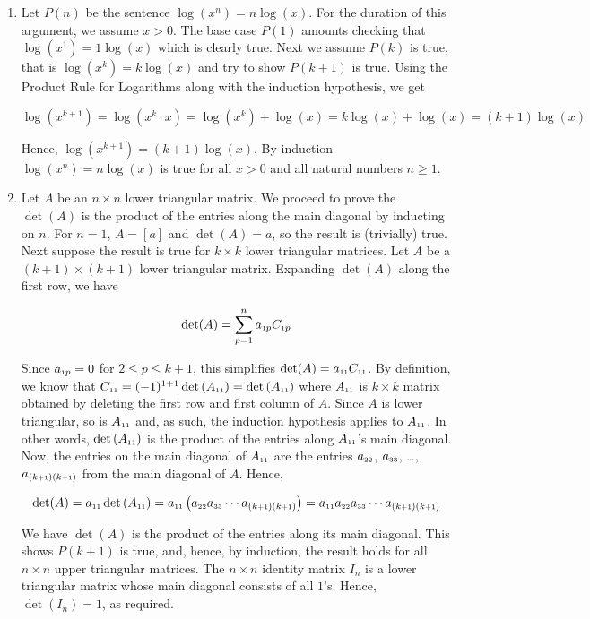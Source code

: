 \documentclass{ximera}
\begin{document}
\begin{enumerate}
\addtocounter{enumi}{1}

\item  Let $P(n)$ be the sentence $\log\left(x^n \right) = n \log(x)$.  For the duration of this argument, we assume $x > 0$. The base case $P(1)$ amounts checking that $\log\left(x^1\right) = 1 \log(x)$ which is clearly true.  Next we assume $P(k)$ is true, that is $\log\left(x^{k}\right) = k \log(x)$ and try to show $P(k+1)$ is true.  Using the Product Rule for Logarithms along with the induction hypothesis, we get

 \[\log\left(x^{k+1}\right) = \log\left(x^{k} \cdot x\right) = \log\left(x^{k}\right) + \log(x) = k \log(x) + \log(x) = (k+1) \log(x) \]
 
 Hence, $\log\left(x^{k+1}\right) = (k+1) \log(x)$.  By induction  $\log\left(x^n \right) = n \log(x)$ is true for all $x>0$ and all natural numbers $n \geq 1$.


\addtocounter{enumi}{2}

\item  Let $A$ be an $n \times n$ lower triangular matrix.  We proceed to prove the $\det(A)$ is the product of the entries along the main diagonal by inducting on $n$.  For $n=1$, $A = [a]$ and $\det(A) = a$, so the result is (trivially) true.  Next suppose the result is true for $k \times k$ lower triangular matrices.  Let $A$ be a $(k+1) \times (k+1)$ lower triangular matrix.  Expanding $\det(A)$ along the first row, we have

\[ \det(A)  = \displaystyle{\sum_{p=1}^{n} a_{\mbox{\tiny$1$}p} C_{\mbox{\tiny$1$}p}} \]

Since $a_{\mbox{\tiny$1$}p} = 0$ for $2 \leq p \leq k+1$, this simplifies $\det(A) = a_{\mbox{\tiny$11$}}C_{\mbox{\tiny$11$}}$.  By definition, we know that $C_{\mbox{\tiny$11$}} = (-1)^{1+1} \det\left(A_{\mbox{\tiny$11$}}\right) =\det\left(A_{\mbox{\tiny$11$}}\right)$ where $A_{\mbox{\tiny$11$}}$ is $k \times k$  matrix obtained by deleting the first row and first column of $A$. Since $A$ is lower triangular, so is $A_{\mbox{\tiny$11$}}$ and, as such, the induction hypothesis applies to $A_{\mbox{\tiny$11$}}$. In other words, $\det\left(A_{\mbox{\tiny$11$}}\right)$ is the product of the entries along $A_{\mbox{\tiny$11$}}$'s main diagonal.  Now, the entries on the main diagonal of $A_{\mbox{\tiny$11$}}$ are the entries $a_{\mbox{\tiny$22$}}$, $a_{\mbox{\tiny$33$}}$, \ldots, $a_{(k\mbox{\tiny$+1$})(k\mbox{\tiny$+1$})}$ from the main diagonal of $A$.  Hence,

\[ \det(A) = a_{\mbox{\tiny$11$}} \det\left(A_{\mbox{\tiny$11$}}\right) = a_{\mbox{\tiny$11$}} \left(a_{\mbox{\tiny$22$}}a_{\mbox{\tiny$33$}} \cdots a_{(k\mbox{\tiny$+1$})(k\mbox{\tiny$+1$})} \right) = a_{\mbox{\tiny$11$}} a_{\mbox{\tiny$22$}}a_{\mbox{\tiny$33$}} \cdots a_{(k\mbox{\tiny$+1$})(k\mbox{\tiny$+1$})}\]

We have $\det(A)$ is the product of the entries along its main diagonal.  This shows $P(k+1)$ is true, and, hence, by induction, the result holds for all $n \times n$ upper triangular matrices. The $n \times n$ identity matrix $I_{n}$ is a lower triangular matrix whose main diagonal consists of all $1$'s.  Hence,  $\det\left(I_{n}\right) = 1$, as required.

\end{enumerate}
\end{document}
